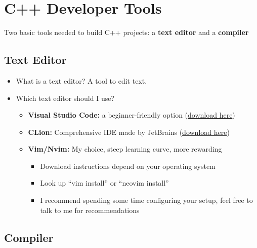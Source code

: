 \documentclass{article}
\begin{document}
\section{C++ Developer Tools}

\noindent
Two basic tools needed to build C++ projects: a \textbf{text editor} and a \textbf{compiler}

\subsection{Text Editor}

\begin{itemize}
	\item What is a text editor? A tool to edit text.
	\item Which text editor should I use? \begin{itemize}
		\item \textbf{Visual Studio Code:} a beginner-friendly option (\href{https://code.visualstudio.com}{download here})
		\item \textbf{CLion:} Comprehensive IDE made by JetBrains (\href{https://www.jetbrains.com/clion/}{download here})
		\item \textbf{Vim/Nvim:} My choice, steep learning curve, more rewarding \begin{itemize}
			\item Download instructions depend on your operating system
			\item Look up ``vim install'' or ``neovim install''
			\item I recommend spending some time configuring your setup, feel free to talk to me for recommendations
		\end{itemize}
	\end{itemize}
\end{itemize}

\subsection{Compiler}
\end{document}
